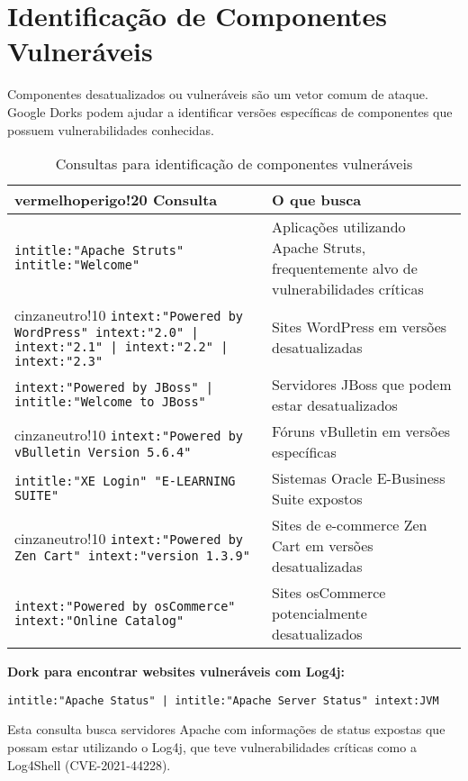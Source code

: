 \documentclass[12pt,a4paper]{book}
\begin{document}
\section{Identificação de Componentes Vulneráveis}

Componentes desatualizados ou vulneráveis são um vetor comum de ataque. Google Dorks podem ajudar a identificar versões específicas de componentes que possuem vulnerabilidades conhecidas.

\begin{table}[h]
\centering
\begin{tabular}{|p{8cm}|p{7cm}|}
\hline
{vermelhoperigo!20} \textbf{Consulta} & \textbf{O que busca} \\
\hline
\texttt{intitle:"Apache Struts" intitle:"Welcome"} & Aplicações utilizando Apache Struts, frequentemente alvo de vulnerabilidades críticas \\
\hline
{cinzaneutro!10} \texttt{intext:"Powered by WordPress" intext:"2.0" | intext:"2.1" | intext:"2.2" | intext:"2.3"} & Sites WordPress em versões desatualizadas \\
\hline
\texttt{intext:"Powered by JBoss" | intitle:"Welcome to JBoss"} & Servidores JBoss que podem estar desatualizados \\
\hline
{cinzaneutro!10} \texttt{intext:"Powered by vBulletin Version 5.6.4"} & Fóruns vBulletin em versões específicas \\
\hline
\texttt{intitle:"XE Login" "E-LEARNING SUITE"} & Sistemas Oracle E-Business Suite expostos \\
\hline
{cinzaneutro!10} \texttt{intext:"Powered by Zen Cart" intext:"version 1.3.9"} & Sites de e-commerce Zen Cart em versões desatualizadas \\
\hline
\texttt{intext:"Powered by osCommerce" intext:"Online Catalog"} & Sites osCommerce potencialmente desatualizados \\
\hline
\end{tabular}
\caption{Consultas para identificação de componentes vulneráveis}
\end{table}

\begin{examplebox}
\textbf{Dork para encontrar websites vulneráveis com Log4j:}

\texttt{intitle:"Apache Status" | intitle:"Apache Server Status" intext:JVM}

Esta consulta busca servidores Apache com informações de status expostas que possam estar utilizando o Log4j, que teve vulnerabilidades críticas como a Log4Shell (CVE-2021-44228).
\end{examplebox}
\end{document}
